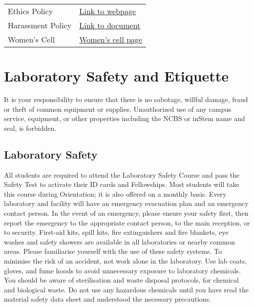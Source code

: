 \documentclass[a4paper]{extarticle}
\begin{document}
\begin{tabular}{l l}
    Ethics Policy & \href{www.ncbs.res.in/ethics}{Link to webpage} \\
    Harassment Policy &
    \href{www.ncbs.res.in/sitefiles/CampusHarassmentPolicyDec2013.pdf}{Link to
    document} \\ 
    Women's Cell & \href{www.ncbs.res.in/women}{Women's cell page}
\end{tabular} \newline

\section{Laboratory Safety and Etiquette}
It is your responsibility to ensure that there is no sabotage, willful damage, fraud or theft of
common equipment or supplies. Unauthorized use of any campus service, equipment, or
other properties including the NCBS or inStem name and seal, is forbidden.

\subsection{Laboratory Safety}
All students are required to attend the Laboratory Safety Course and
pass the Safety Test to activate their ID cards and Fellowships. Most students will take this
course during Orientation; it is also offered on a monthly basis. Every laboratory and facility
will have an emergency evacuation plan and an emergency contact person. In the event of an
emergency, please ensure your safety first, then report the emergency to the appropriate
contact person, to the main reception, or to security. First-aid kits, spill kits, fire
extinguishers and fire blankets, eye washes and safety showers are available in all
laboratories or nearby common areas. Please familiarise yourself with the use of these safety
systems. To minimise the risk of an accident, not work alone in the laboratory. Use lab
coats, gloves, and fume hoods to avoid unnecessary exposure to laboratory chemicals. You
should be aware of sterilisation and waste disposal protocols, for chemical and biological
waste. Do not use any hazardous chemicals until you have read the material safety data sheet
and understood the necessary precautions.
\end{document}

